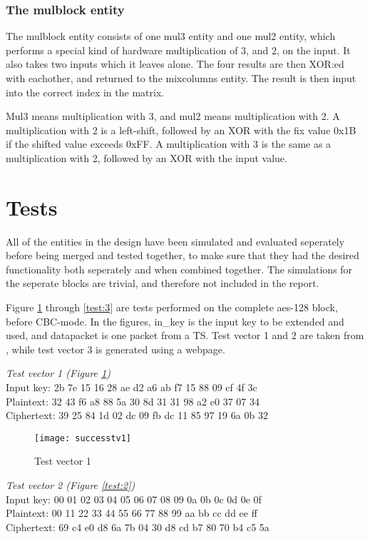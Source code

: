 \subsubsection{The mulblock entity}
The mulblock entity consists of one mul3 entity and one mul2 entity, 
which performs a special kind of hardware multiplication of 3, and 2, 
on the input. It also takes two inputs which it leaves alone. The four 
results are then XOR:ed with eachother, and returned to the mixcolumns 
entity. The result is then input into the correct index in the matrix. 

Mul3 means multiplication with 3, and mul2 means multiplication with 2. 
A multiplication with 2 is a left-shift, followed by an XOR with the 
fix value 0x1B if the shifted value exceeds 0xFF. A multiplication with 
3 is the same as a multiplication with 2, followed by an XOR with the 
input value.

\section{Tests}
All of the entities in the design have been simulated and evaluated 
seperately before being merged and tested together, to make sure that 
they had the desired functionality both seperately and when combined 
together. The simulations for the seperate blocks are trivial, and 
therefore not included in the report.

Figure \ref{test:1} through \ref{test:3} are tests performed on the 
complete aes-128 block, before CBC-mode. In the figures, in\_key is the 
input key to be extended and used, and datapacket is one packet from a 
TS. Test vector 1 and 2 are taken from \citep{AES:2001}, while test 
vector 3 is generated using a webpage.

\emph{Test vector 1 (Figure \ref{test:1})}\\
Input key: 2b 7e 15 16 28 ae d2 a6 ab f7 15 88 09 cf 4f 3c\\
Plaintext: 32 43 f6 a8 88 5a 30 8d 31 31 98 a2 e0 37 07 34\\
Ciphertext: 39 25 84 1d 02 dc 09 fb dc 11 85 97 19 6a 0b 32

\begin{figure}
  \texttt{[image: successtv1]}
  \caption{Test vector 1}
  \label{test:1}
\end{figure}

\emph{Test vector 2 (Figure \ref{test:2})}\\
Input key: 00 01 02 03 04 05 06 07 08 09 0a 0b 0c 0d 0e 0f\\
Plaintext: 00 11 22 33 44 55 66 77 88 99 aa bb cc dd ee ff\\
Ciphertext: 69 c4 e0 d8 6a 7b 04 30 d8 cd b7 80 70 b4 c5 5a

